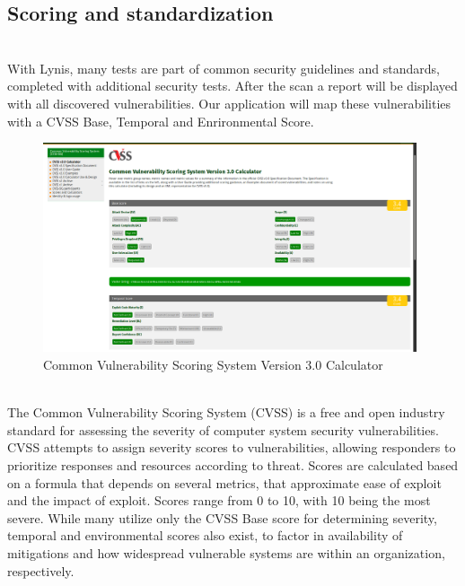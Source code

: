 \pagebreak

\subsection{Scoring and standardization}

\vspace{1cm}
\\
With Lynis, many tests are part of common security guidelines and standards,
completed with additional security tests. After the scan a report will be displayed
with all discovered vulnerabilities. Our application will map these vulnerabilities with a CVSS Base, Temporal and Enrironmental Score.

\vspace{0.2cm}

\begin{figure}[!h]
  \centering
  \includegraphics[width=0.98\textwidth]{images/cvss.png}
  \caption{Common Vulnerability Scoring System Version 3.0 Calculator}
  \label{ArchitectureSchema}
\end{figure}

\vspace{1cm}

\\
The Common Vulnerability Scoring System (CVSS) is a free and open industry standard for assessing the severity of computer system security vulnerabilities. CVSS attempts to assign severity scores to vulnerabilities, allowing responders to prioritize responses and resources according to threat. Scores are calculated based on a formula that depends on several metrics, that approximate ease of exploit and the impact of exploit. Scores range from 0 to 10, with 10 being the most severe. While many utilize only the CVSS Base score for determining severity, temporal and environmental scores also exist, to factor in availability of mitigations and how widespread vulnerable systems are within an organization, respectively.


